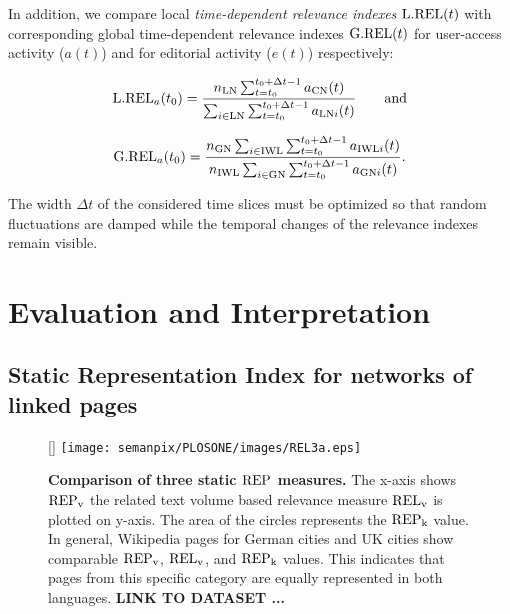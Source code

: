 \documentclass[a4paper,10pt]{scrbook}
\begin{document}
In addition, we compare local \textit{time-dependent relevance indexes} ${\rm
L.REL}(t)$ with corresponding global time-dependent relevance indexes ${\rm
G.REL}(t)$ for user-access activity ($a(t)$) and for editorial activity ($e(t)$) respectively:

\begin{equation}
{\rm L.REL}_a(t_0) = {n_{\rm LN} \sum_{t=t_0}^{t_0+\Delta t-1} a_{\rm CN}(t) \over
\sum_{i \in {\rm LN}} \sum_{t=t_0}^{t_0+\Delta t-1} a_{{\rm LN} i}(t)} \qquad {\rm
and}
\label{EQ.L.REL}
\end{equation}

\begin{equation}
{\rm G.REL}_a(t_0) = {n_{\rm GN} \sum_{i \in {\rm IWL}}\sum_{t=t_0}^{t_0+\Delta
t-1} a_{{\rm IWL} i}(t) \over n_{\rm IWL} \sum_{i \in {\rm GN}}
\sum_{t=t_0}^{t_0+\Delta t-1} a_{{\rm GN} i}(t)}.
\label{EQ.G.REL}
\end{equation}

The width $\Delta t$ of the considered time slices must be optimized so that 
random fluctuations are damped while the temporal changes of the relevance indexes 
remain visible.



\section{Evaluation and Interpretation}

\subsection{Static Representation Index for networks of linked pages}

\begin{figure}[!t]
[\FBwidth]
{
\texttt{[image: semanpix/PLOSONE/images/REL3a.eps]}
}
{
\caption{
{\bf Comparison of three static $\rm REP$ measures.} The x-axis shows $\rm
REP_v$ the related text volume based relevance measure $\rm
REL_v$ is plotted on y-axis. The area of the circles represents the
$\rm REP_{k}$ value. In general, Wikipedia pages for German cities and UK cities show comparable $\rm
\rm REP_v$,  $\rm REL_v$, and $\rm REP_k$ values. This indicates that pages from this specific category 
are equally represented in both languages. \textbf{LINK TO DATASET ...}
}
\label{fig.REP.3}
}
\end{figure}
\end{document}
